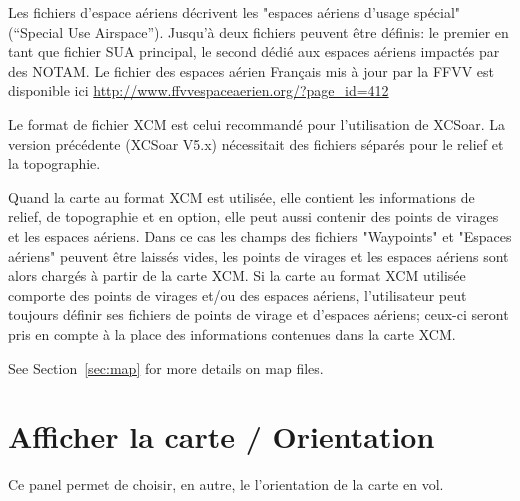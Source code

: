 Les fichiers d'espace aériens décrivent les "espaces aériens d'usage spécial" (“Special Use Airspace”). Jusqu'à deux fichiers peuvent être définis: le premier en tant que fichier SUA principal, le second dédié aux espaces aériens impactés par des NOTAM. 
Le fichier des espaces aérien Français mis à jour par la FFVV est disponible ici \url{http://www.ffvvespaceaerien.org/?page_id=412}


Le format de fichier XCM est celui recommandé pour l'utilisation de XCSoar. La version précédente (XCSoar V5.x) nécessitait des fichiers séparés pour le relief et la topographie.

Quand la carte au format XCM est utilisée, elle contient les informations de relief, de topographie et en option, elle peut aussi contenir des points de virages et les espaces aériens. Dans ce cas les champs des fichiers "Waypoints" et "Espaces aériens" peuvent être laissés vides, les points de virages et les espaces aériens sont alors chargés à partir de la carte XCM. Si la carte au format XCM utilisée comporte des points de virages et/ou des espaces aériens, l'utilisateur peut toujours définir ses fichiers de points de virage et d'espaces aériens; ceux-ci seront pris en compte à la place des informations contenues dans la carte XCM.

See Section~\ref{sec:map} for more details on map files.


\section{Afficher la carte / Orientation}\label{sec:map-projection}

Ce panel permet de choisir, en autre, le l'orientation de la carte en vol.

